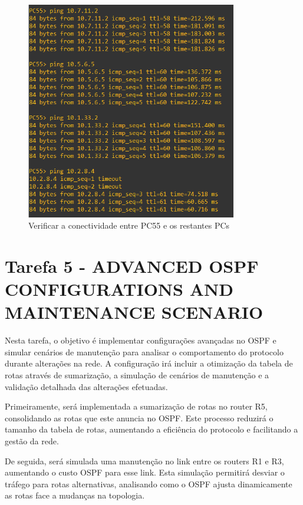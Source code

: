 \documentclass[11pt,english, openright, oneside]{book}
\begin{document}
\begin{figure}[H]
  \centering
  \includegraphics[width=0.82\textwidth]{imagens/Tarefa4/23.ping_PC55_PC11_PC22_PC33.png}
  \caption{Verificar a conectividade entre PC55 e os restantes PCs}
  \label{fig:config41}
\end{figure}
\pagebreak

\section{Tarefa 5 - ADVANCED OSPF CONFIGURATIONS AND MAINTENANCE SCENARIO}
\vspace{0.2cm}

Nesta tarefa, o objetivo é implementar configurações avançadas no OSPF e simular cenários de manutenção para analisar o comportamento do protocolo durante alterações na rede. A configuração irá incluir a otimização da tabela de rotas através de sumarização, a simulação de cenários de manutenção e a validação detalhada das alterações efetuadas.

Primeiramente, será implementada a sumarização de rotas no router R5, consolidando as rotas que este anuncia no OSPF. Este processo reduzirá o tamanho da tabela de rotas, aumentando a eficiência do protocolo e facilitando a gestão da rede.

De seguida, será simulada uma manutenção no link entre os routers R1 e R3, aumentando o custo OSPF para esse link. Esta simulação permitirá desviar o tráfego para rotas alternativas, analisando como o OSPF ajusta dinamicamente as rotas face a mudanças na topologia.
\end{document}
